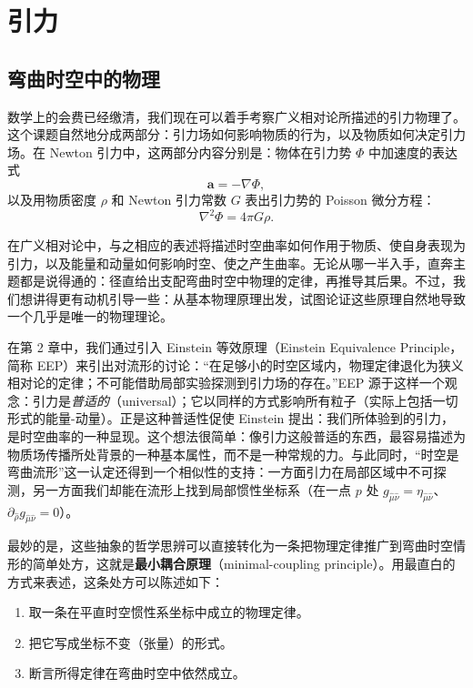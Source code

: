 
\chapter{引力}

\section{弯曲时空中的物理}

数学上的会费已经缴清，我们现在可以着手考察广义相对论所描述的引力物理了。这个课题自然地分成两部分：引力场如何影响物质的行为，以及物质如何决定引力场。在 Newton 引力中，这两部分内容分别是：物体在引力势 $\Phi$ 中加速度的表达式
\begin{equation*}
\mathbf{a} = -\nabla\Phi,
\tag{4.1}
\end{equation*}
以及用物质密度 $\rho$ 和 Newton 引力常数 $G$ 表出引力势的 Poisson 微分方程：
\begin{equation*}
\nabla^2\Phi = 4\pi G\rho.
\tag{4.2}
\end{equation*}

在广义相对论中，与之相应的表述将描述时空曲率如何作用于物质、使自身表现为引力，以及能量和动量如何影响时空、使之产生曲率。无论从哪一半入手，直奔主题都是说得通的：径直给出支配弯曲时空中物理的定律，再推导其后果。不过，我们想讲得更有动机引导一些：从基本物理原理出发，试图论证这些原理自然地导致一个几乎是唯一的物理理论。

在第 2 章中，我们通过引入 Einstein 等效原理（Einstein Equivalence Principle，简称 EEP）来引出对流形的讨论：“在足够小的时空区域内，物理定律退化为狭义相对论的定律；不可能借助局部实验探测到引力场的存在。”EEP 源于这样一个观念：引力是\emph{普适的}（universal）；它以同样的方式影响所有粒子（实际上包括一切形式的能量-动量）。正是这种普适性促使 Einstein 提出：我们所体验到的引力，是时空曲率的一种显现。这个想法很简单：像引力这般普适的东西，最容易描述为物质场传播所处背景的一种基本属性，而不是一种常规的力。与此同时，“时空是弯曲流形”这一认定还得到一个相似性的支持：一方面引力在局部区域中不可探测，另一方面我们却能在流形上找到局部惯性坐标系（在一点 $p$ 处 $g_{\hat\mu\hat\nu}=\eta_{\hat\mu\hat\nu}$、$\partial_{\hat\rho}g_{\hat\mu\hat\nu}=0$）。

最妙的是，这些抽象的哲学思辨可以直接转化为一条把物理定律推广到弯曲时空情形的简单处方，这就是\textbf{最小耦合原理}（minimal-coupling principle）。用最直白的方式来表述，这条处方可以陈述如下：

\begin{enumerate}
\item 取一条在平直时空惯性系坐标中成立的物理定律。
\item 把它写成坐标不变（张量）的形式。
\item 断言所得定律在弯曲时空中依然成立。
\end{enumerate}

